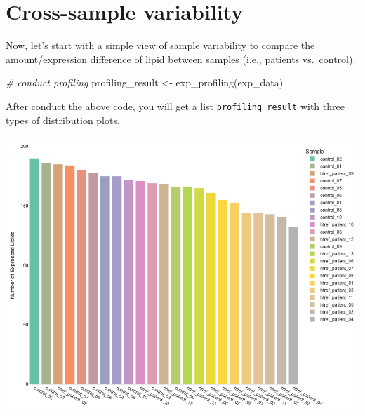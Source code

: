 \documentclass[]{article}
\newcommand{\hlstr}[1]{\textcolor[rgb]{0.251,0.627,0.251}{#1}}%
\newcommand{\hlcom}[1]{\textcolor[rgb]{0.502,0.502,0.502}{\textit{#1}}}%
\newcommand{\hlopt}[1]{\textcolor[rgb]{0,0,0}{#1}}%
\newcommand{\hlstd}[1]{\textcolor[rgb]{0.251,0.251,0.251}{#1}}%
\newcommand{\hlkwd}[1]{\textcolor[rgb]{0.878,0.439,0.125}{#1}}%
\newenvironment{Shaded}{\begin{myshaded}}{\end{myshaded}}
\newcommand{\KeywordTok}[1]{\hlkwd{#1}}
\newcommand{\StringTok}[1]{\hlstr{#1}}
\newcommand{\CommentTok}[1]{\hlcom{#1}}
\newcommand{\OperatorTok}[1]{\hlopt{#1}}
\newcommand{\NormalTok}[1]{\hlstd{#1}}
\begin{document}
\hypertarget{cross-sample-variability}{%
\section{Cross-sample variability}\label{cross-sample-variability}}

Now, let's start with a simple view of sample variability to compare the amount/expression difference of lipid between samples (i.e., patients vs.~control).

\begin{Shaded}
\begin{Highlighting}[]
\CommentTok{# conduct profiling}
\NormalTok{profiling_result <-}\StringTok{ }\KeywordTok{exp_profiling}\NormalTok{(exp_data)}
\end{Highlighting}
\end{Shaded}

After conduct the above code, you will get a list \texttt{profiling\_result} with three types of distribution plots.

\begin{Shaded}
\end{Shaded}

\includegraphics{./image/exp_profilling_1.png}

\begin{Shaded}
\end{Shaded}
\end{document}
